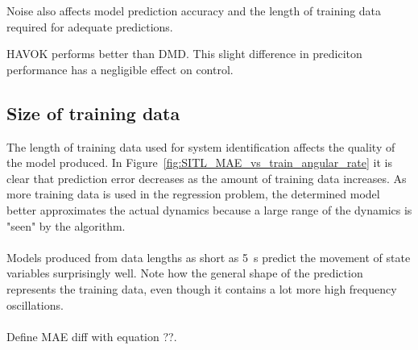 
        Noise also affects model prediction accuracy and the length of training data required for adequate predictions. 
        
        

        

        HAVOK performs better than DMD.
        This slight difference in prediciton performance has a negligible effect on control.
        

    

    \subsection{Size of training data}
        The length of training data used for system identification affects the quality of the model produced.
        In Figure~\ref{fig:SITL_MAE_vs_train_angular_rate} it is clear that prediction error decreases as the amount of training data increases.
        As more training data is used in the regression problem, 
        the determined model better approximates the actual dynamics because a large range of the dynamics is "seen" by the algorithm.
        
        \paragraph{}
        Models produced from data lengths as short as \SI{5}{\second} predict the movement of state variables surprisingly well.
        Note how the general shape of the prediction represents the training data, 
        even though it contains a lot more high frequency oscillations.

        

        \paragraph{}
        Define MAE diff with equation ??.

